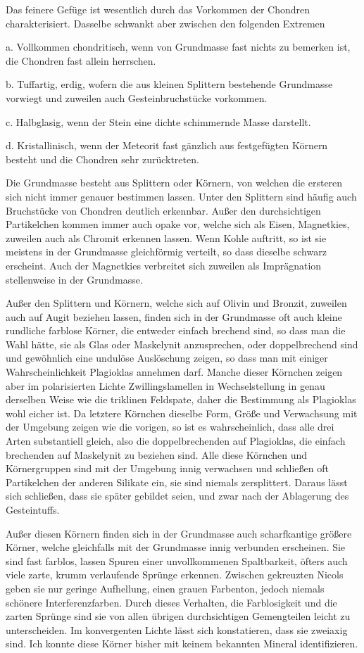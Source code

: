 \documentclass[a4paper, 11pt, oneside, polutonikogreek, german]{article}
\begin{document}
Das feinere Gefüge ist wesentlich durch das Vorkommen der Chondren charakterisiert. Dasselbe schwankt aber zwischen den folgenden Extremen

a. Vollkommen chondritisch, wenn von Grundmasse fast nichts zu bemerken ist, die Chondren fast allein herrschen.

b. Tuffartig, erdig, wofern die aus kleinen Splittern bestehende Grundmasse vorwiegt und zuweilen auch Gesteinbruchstücke vorkommen.

c. Halbglasig, wenn der Stein eine dichte schimmernde Masse darstellt.

d. Kristallinisch, wenn der Meteorit fast gänzlich aus festgefügten Körnern besteht und die Chondren sehr zurücktreten.

Die Grundmasse besteht aus Splittern oder Körnern, von welchen die ersteren sich nicht immer genauer bestimmen lassen. Unter den Splittern sind häufig auch Bruchstücke von Chondren deutlich erkennbar. Außer den durchsichtigen Partikelchen kommen immer auch opake vor, welche sich als Eisen, Magnetkies, zuweilen auch als Chromit erkennen lassen. Wenn Kohle auftritt, so ist sie meistens in der Grundmasse gleichförmig verteilt, so dass dieselbe schwarz erscheint. Auch der Magnetkies verbreitet sich zuweilen als Imprägnation stellenweise in der Grundmasse.

Außer den Splittern und Körnern, welche sich auf Olivin und Bronzit, zuweilen auch auf Augit beziehen lassen, finden sich in der Grundmasse oft auch kleine rundliche farblose Körner, die entweder einfach brechend sind, so dass man die Wahl hätte, sie als Glas oder Maskelynit anzusprechen, oder doppelbrechend sind und gewöhnlich eine undulöse Auslöschung zeigen, so dass man mit einiger Wahrscheinlichkeit Plagioklas annehmen darf. Manche dieser Körnchen zeigen aber im polarisierten Lichte Zwillingslamellen in Wechselstellung in genau derselben Weise wie die triklinen Feldspate, daher die Bestimmung als Plagioklas wohl eicher ist. Da letztere Körnchen dieselbe Form, Größe und Verwachsung mit der Umgebung zeigen wie die vorigen, so ist es wahrscheinlich, dass alle drei Arten substantiell gleich, also die doppelbrechenden auf Plagioklas, die einfach brechenden auf Maskelynit zu beziehen sind. Alle diese Körnchen und Körnergruppen sind mit der Umgebung innig verwachsen und schließen oft Partikelchen der anderen Silikate ein, sie sind niemals zersplittert. Daraus lässt sich schließen, dass sie später gebildet seien, und zwar nach der Ablagerung des Gesteintuffs.

Außer diesen Körnern finden sich in der Grundmasse auch scharfkantige größere Körner, welche gleichfalls mit der Grundmasse innig verbunden erscheinen. Sie sind fast farblos, lassen Spuren einer unvollkommenen Spaltbarkeit, öfters auch viele zarte, krumm verlaufende Sprünge erkennen. Zwischen gekreuzten Nicols geben sie nur geringe Aufhellung, einen grauen Farbenton, jedoch niemals schönere Interferenzfarben. Durch dieses Verhalten, die Farblosigkeit und die zarten Sprünge sind sie von allen übrigen durchsichtigen Gemengteilen leicht zu unterscheiden. Im konvergenten Lichte lässt sich konstatieren, dass sie zweiaxig sind. Ich konnte diese Körner bisher mit keinem bekannten Mineral identifizieren.
\end{document}
